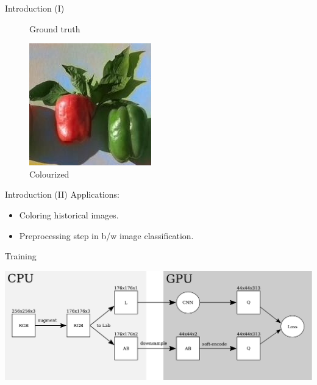\documentclass{beamer}
\begin{document}
\begin{frame}{Introduction (I)}
\begin{figure}[!htb]
      \caption{Ground truth}
    \endminipage\hfill
      \includegraphics[width=\linewidth]{resources/colored.jpg}
      \caption{Colourized}
    \endminipage
  \end{figure}
\end{frame}

\begin{frame}{Introduction (II)}
  Applications:
    \begin{itemize}
        \item Coloring historical images.
        \item Preprocessing step in b/w image classification.
    \end{itemize}
\end{frame}


\begin{frame}{Training}
  \begin{center}
    \includegraphics[width=\textwidth]{resources/training.pdf}
  \end{center}
\end{frame}
\end{document}
